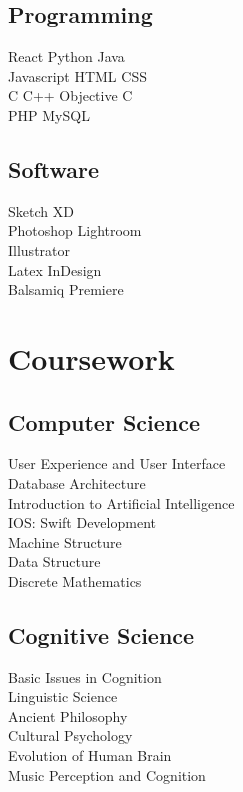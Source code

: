 \documentclass[]{deedy-resume-openfont}
\begin{document}
\begin{minipage}[t]{0.33\textwidth}
\subsection{Programming}
React \textbullet{} Python \textbullet{} Java\\
Javascript \textbullet{} HTML \textbullet{}   CSS \\
C \textbullet{} C++ \textbullet{} Objective C \\
PHP \textbullet{} MySQL  \\
\sectionsep

\subsection{Software}
Sketch \textbullet{} XD\\
Photoshop \textbullet{} Lightroom\\
Illustrator\\
Latex \textbullet{} InDesign\\
Balsamiq \textbullet{} Premiere\\
\sectionsep


\section{Coursework}

\subsection{Computer Science}
User Experience and User Interface\\
Database Architecture\\
Introduction to Artificial Intelligence\\
IOS: Swift Development\\
Machine Structure\\
Data Structure\\
Discrete Mathematics\\
\sectionsep

\subsection{Cognitive Science}
Basic Issues in Cognition\\
Linguistic Science\\
Ancient Philosophy\\
Cultural Psychology\\
Evolution of Human Brain\\
Music Perception and Cognition\\
\sectionsep





%
%

\end{minipage} 
\end{document}
